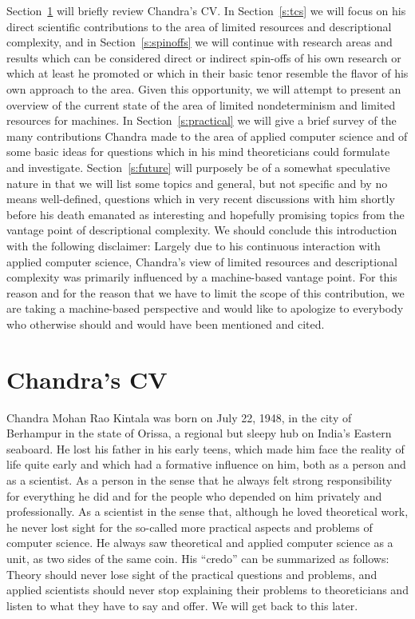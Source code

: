 \documentclass[copyright]{eptcs}
\begin{document}
Section~\ref{s:cv} will briefly review Chandra's CV. In Section~\ref{s:tcs} we will focus on his direct scientific 
contributions to the area of limited resources and descriptional complexity, and in Section~\ref{s:spinoffs} we 
will continue with research areas and results which can be considered direct or indirect spin-offs
of his own research or which at least he promoted or which in their basic tenor resemble the flavor 
of his own approach to the area. Given this opportunity, we will attempt to present an overview of the current
state of the area of limited nondeterminism and limited resources for machines. In Section~\ref{s:practical}
we will give a brief survey of the many contributions 
Chandra made to the area of applied computer science and of some basic ideas for questions which in 
his mind theoreticians could formulate and investigate. Section~\ref{s:future} will purposely be of a somewhat 
speculative nature in that we will list some topics and general, but not specific and by no means
 well-defined, questions which in very recent discussions with him shortly before his death emanated 
as interesting and hopefully promising topics from the vantage point of descriptional complexity. 
We should conclude this introduction with the following disclaimer: Largely due to his continuous 
interaction with applied computer science, Chandra's view of limited resources and descriptional 
complexity was primarily influenced by a machine-based vantage point. For this reason and for the 
reason that we have to limit the scope of this contribution, we are taking a machine-based perspective 
and would like to apologize to everybody who otherwise should and would have been mentioned and cited. 


\section{Chandra's CV}\label{s:cv}
Chandra Mohan Rao Kintala was born on July 22, 1948, in the city of Berhampur in the state of Orissa, 
a regional but sleepy hub on India's Eastern seaboard. He lost his father in his early teens, which 
made him face the reality of life quite early and which had a formative influence on him, both as a 
person and as a scientist. As a person in the sense that he always felt strong responsibility for 
everything he did and for the people who depended on him privately and professionally. As a scientist 
in the sense that, although he loved theoretical work, he never lost sight for the so-called more practical 
aspects and problems of computer science. He always saw theoretical and applied computer science as 
a unit, as two sides of the same coin. His ``credo'' can be summarized as follows: Theory should never 
lose sight of the practical questions and problems, and applied scientists should never stop explaining 
their problems to theoreticians and listen to what they have to say and offer. We will get back to this later. 
\end{document}
